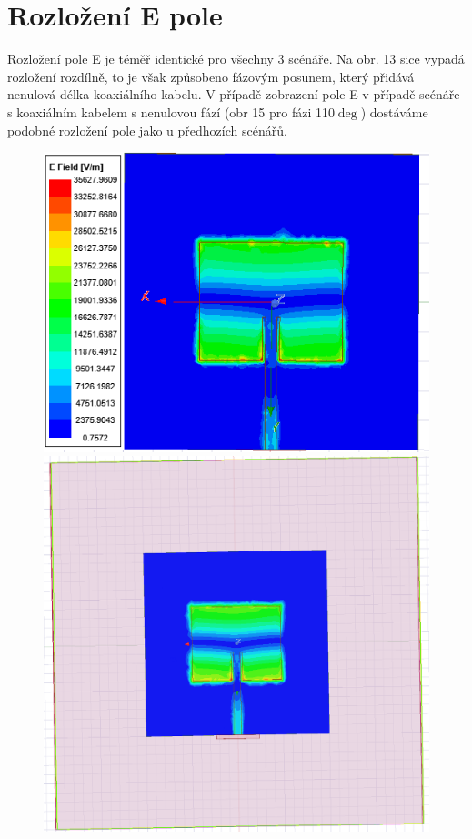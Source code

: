 \documentclass[10pt, a4paper]{article}%
\begin{document}
	\section{\Large Rozložení E pole}
	Rozložení pole E je téměř identické pro všechny 3 scénáře. Na obr. 13
	sice vypadá rozložení rozdílně, to je však způsobeno fázovým posunem,
	který přidává nenulová délka koaxiálního kabelu. V případě zobrazení pole
	E v případě scénáře s koaxiálním kabelem s nenulovou fází (obr 15 pro fázi 110$\deg$)
	dostáváme podobné rozložení pole jako u předhozích scénářů.
\begin{figure}[ht!]
	\centering
	\begin{minipage}{0.32\textwidth}
		\centering
		\includegraphics[width= 1\textwidth]{EFIELD_free_space.png}
	\end{minipage}%
	\hfill
	\begin{minipage}{0.32\textwidth}
		\centering
		\includegraphics[width= 1\textwidth]{EFIELD_phantom.png}

\end{minipage}
\end{figure}
\end{document}
